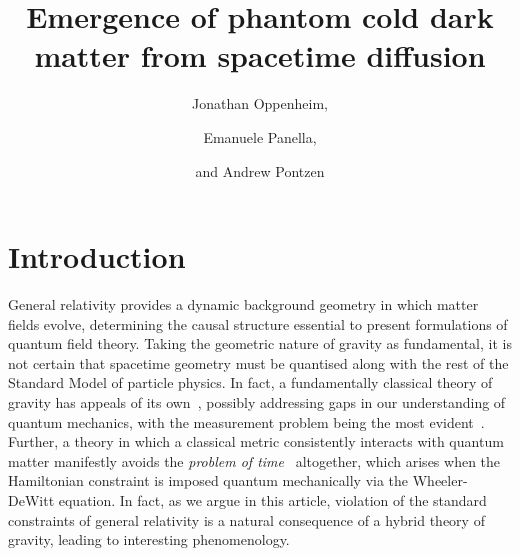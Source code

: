 \documentclass[amsmath,amssymb,11pt]{article}
\title{Emergence of phantom cold dark matter from spacetime diffusion}
\author{Jonathan Oppenheim,}
\author{Emanuele Panella,}
\author{and Andrew Pontzen}
\affiliation{
Department of Physics and Astronomy, University College London,\\
Gower Street, London, WC1E 6BT, United Kingdom}
\begin{document}
\maketitle

\section{Introduction} \label{sec:intro}

General relativity provides a dynamic background geometry in which matter fields evolve, determining the causal structure essential to present formulations of quantum field theory. Taking the geometric nature of gravity as fundamental, it is not certain that spacetime geometry must be quantised along with the rest of the Standard Model of particle physics. In fact, a fundamentally classical theory of gravity has appeals of its own~\cite{oppenheim2023is-it-time}, possibly addressing gaps in our understanding of quantum mechanics, with the measurement problem being the most evident~\cite{singh2015possible}. Further, a theory in which a classical metric consistently interacts with quantum matter manifestly avoids the {\it problem of time}~\cite{isham1992canonical,kuchar1992time,anderson2012problem} altogether, which arises when the Hamiltonian constraint is imposed quantum mechanically via the Wheeler-DeWitt equation. In fact, as we argue in this article, violation of the standard constraints of general relativity is a natural consequence of a hybrid theory of gravity, leading to interesting phenomenology.
\end{document}
